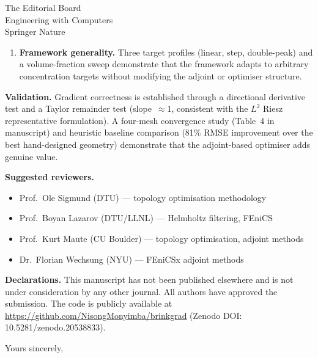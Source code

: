 \documentclass[12pt,a4paper]{letter}
\begin{document}
\begin{letter}{
    The Editorial Board\\
    Engineering with Computers\\
    Springer Nature
}
\begin{enumerate}
\item \textbf{Framework generality.}
Three target profiles (linear, step, double-peak) and a
volume-fraction sweep demonstrate that the framework adapts
to arbitrary concentration targets without modifying the
adjoint or optimiser structure.
\end{enumerate}

\textbf{Validation.}
Gradient correctness is established through a directional derivative test
and a Taylor remainder test (slope~$\approx1$, consistent with the
$L^2$ Riesz representative formulation).
A four-mesh convergence study (Table~4 in manuscript) and heuristic
baseline comparison (81\% RMSE improvement over the best hand-designed
geometry) demonstrate that the adjoint-based optimiser adds genuine value.

\textbf{Suggested reviewers.}
\begin{itemize}
\item Prof.\ Ole Sigmund (DTU) --- topology optimisation methodology
\item Prof.\ Boyan Lazarov (DTU/LLNL) --- Helmholtz filtering, FEniCS
\item Prof.\ Kurt Maute (CU Boulder) --- topology optimisation, adjoint methods
\item Dr.\ Florian Wechsung (NYU) --- FEniCSx adjoint methods
\end{itemize}

\textbf{Declarations.}
This manuscript has not been published elsewhere and is not under
consideration by any other journal.
All authors have approved the submission.
The code is publicly available at
\url{https://github.com/NisongMonyimba/brinkgrad}
(Zenodo DOI: 10.5281/zenodo.20538833).

\closing{Yours sincerely,}

\end{letter}
\end{document}
